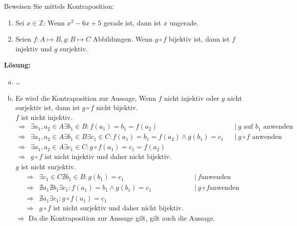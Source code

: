 \documentclass[11pt, a4paper]{article}
\begin{document}
\begin{enumerate}
    Beweisen Sie mittels Kontraposition:\\
    \begin{enumerate}
        \item Sei $x \in \mathbb{Z}$: Wenn $x^2 - 6x + 5$ gerade ist, dann ist $x$ ungerade.\\
        \item Seien $f : A \mapsto B, g : B \mapsto C$ Abbildungen. Wenn $g \circ f$ bijektiv ist, dann ist $f$ injektiv und $g$
        surjektiv.\\
    \end{enumerate}
    {\bfseries Lösung:\\}
    \begin{enumerate}[(a)]
        \item \dots\\
        \item Es wird die Kontraposition zur Aussage, Wenn $f$ nicht injektiv oder $g$
        nicht surjektiv ist, dann ist $g \circ f$ nicht bijektiv.\\
        $f$ ist nicht injektiv.\\
        \begin{align*}
            \Rightarrow& \exists a_1, a_2 \in A \exists b_1 \in B: f(a_1) = b_1 = f(a_2) &&|~g\text{ auf }b_1 \text{ anwenden}\\
            \Rightarrow& \exists a_1, a_2 \in A \exists b_1 \in B \exists c_1 \in C: f(a_1) = b_1 = f(a_2) \land g(b_1) = c_1 &&|~g \circ f \text{ anwenden}\\
            \Rightarrow& \exists a_1, a_2 \in A \exists c_1 \in C: g \circ f(a_1) = c_1 = f(a_2) &&\\
            \Rightarrow& g \circ f\text{ ist nicht injektiv und daher nicht bijektiv.}
        \end{align*}
        $g$ ist nicht surjektiv.\\
        \begin{align*}
            \Rightarrow& \exists c_1 \in C \nexists b_1 \in B: g(b_1) = c_1 &&|~f \text{anwenden}\\
            \Rightarrow& \nexists a_1 \nexists b_1 \exists c_1: f(a_1) = b_1 \land g(b_1) = c_1 &&|~g \circ f \text{anwenden}\\
            \Rightarrow& \nexists a_1 \exists c_1: g \circ f(a_1) = c_1 \\
            \Rightarrow& g \circ f\text{ ist nicht surjektiv und daher nicht bijektiv.}
        \end{align*}
        $\Rightarrow$ Da die Kontraposition zur Aussage gilt, gilt auch die Aussage.\\

\end{enumerate}
\end{enumerate}
\end{document}
